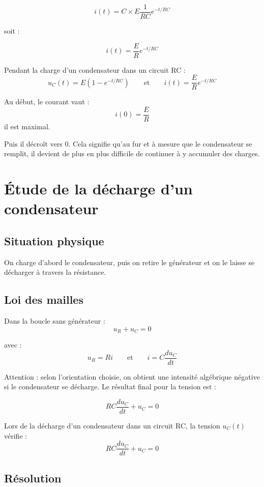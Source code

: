 \documentclass[11pt,a4paper]{article}
\begin{document}
\[
i(t)= C \times E\frac{1}{RC}e^{-t/RC}
\]

soit :

\[
i(t)=\frac{E}{R}e^{-t/RC}
\]

\begin{propriete}
Pendant la charge d'un condensateur dans un circuit RC :
\[
u_C(t)=E\left(1-e^{-t/RC}\right)
\qquad \text{et} \qquad
i(t)=\frac{E}{R}e^{-t/RC}
\]
\end{propriete}

\begin{interpretation}
Au début, le courant vaut :
\[
i(0)=\frac{E}{R}
\]
il est maximal.

Puis il décroît vers \(0\). Cela signifie qu'au fur et à mesure que le condensateur se remplit, il devient de plus en plus difficile de continuer à y accumuler des charges.
\end{interpretation}

\section{Étude de la décharge d'un condensateur}

\subsection{Situation physique}

On charge d'abord le condensateur, puis on retire le générateur et on le laisse se décharger à travers la résistance.

\subsection{Loi des mailles}

Dans la boucle sans générateur :
\[
u_R + u_C = 0
\]

avec :
\[
u_R = Ri
\qquad \text{et} \qquad
i = C \frac{du_C}{dt}
\]

Attention : selon l'orientation choisie, on obtient une intensité algébrique négative si le condensateur se décharge. Le résultat final pour la tension est :

\[
RC \frac{du_C}{dt} + u_C = 0
\]

\begin{propriete}
Lors de la décharge d'un condensateur dans un circuit RC, la tension \(u_C(t)\) vérifie :
\[
RC \frac{du_C}{dt} + u_C = 0
\]
\end{propriete}

\subsection{Résolution}
\end{document}
